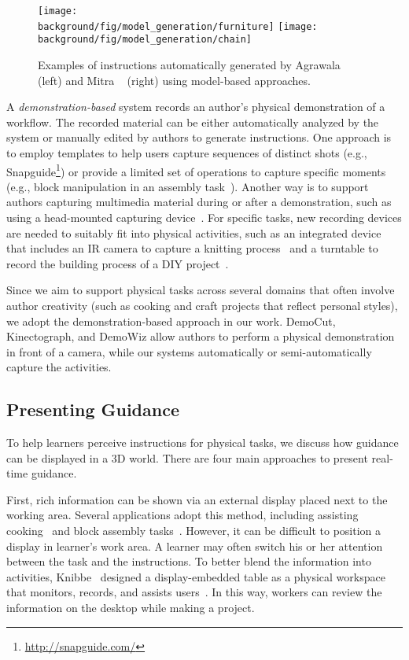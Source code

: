 \begin{figure*}[t!]
  \centering
  \texttt{[image: \\background/fig/model\_generation/furniture]}
  \texttt{[image: \\background/fig/model\_generation/chain]}
  \caption{Examples of instructions automatically generated by Agrawala \ea~\cite{agrawala2003designing} (left) and Mitra \ea~\cite{mitra2010illustrating} (right) using model-based approaches.}
  \label{fig:related_models}
\end{figure*}

A \emph{demonstration-based} system records an author's physical demonstration of a workflow. The recorded material can be either automatically analyzed by the system or manually edited by authors to generate instructions.
%
One approach is to employ templates to help users capture sequences of distinct shots (e.g., Snapguide\footnote{\url{http://snapguide.com/}}) or provide a limited set of operations to capture specific moments (e.g., block manipulation in an assembly task~\cite{Ranjan:2007,Gupta:2012ku}).
%
Another way is to support authors capturing multimedia material during or after a demonstration, such as using a head-mounted capturing device~\cite{carter2015authoring}. For specific tasks, new recording devices are needed to suitably fit into physical activities, such as an integrated device that includes an IR camera to capture a knitting process~\cite{Rosner:2008:SAK:1409635.1409682} and a turntable to record the building process of a DIY project~\cite{Tseng:2015:SPT:2771839.2771869}.

Since we aim to support physical tasks across several domains that often involve author creativity (such as cooking and craft projects that reflect personal styles), we adopt the demonstration-based approach in our work. DemoCut, Kinectograph, and DemoWiz allow authors to perform a physical demonstration in front of a camera, while our systems automatically or semi-automatically capture the activities.


\subsection{Presenting Guidance}
To help learners perceive instructions for physical tasks, we discuss how guidance can be displayed in a 3D world. There are four main approaches to present real-time guidance.

First, rich information can be shown via an external display placed next to the working area. Several applications adopt this method, including assisting cooking~\cite{Uriu:2012:PRM:2207676.2207695} and block assembly tasks~\cite{Gupta:2012ku,Wu:2016:ARI:2856400.2856416}. However, it can be difficult to position a display in learner's work area. A learner may often switch his or her attention between the task and the instructions. To better blend the information into activities, Knibbe~\ea{} designed a display-embedded table as a physical workspace that monitors, records, and assists users~\cite{Knibbe:2015:SMI:2817721.2817741}. In this way, workers can review the information on the desktop while making a project.

